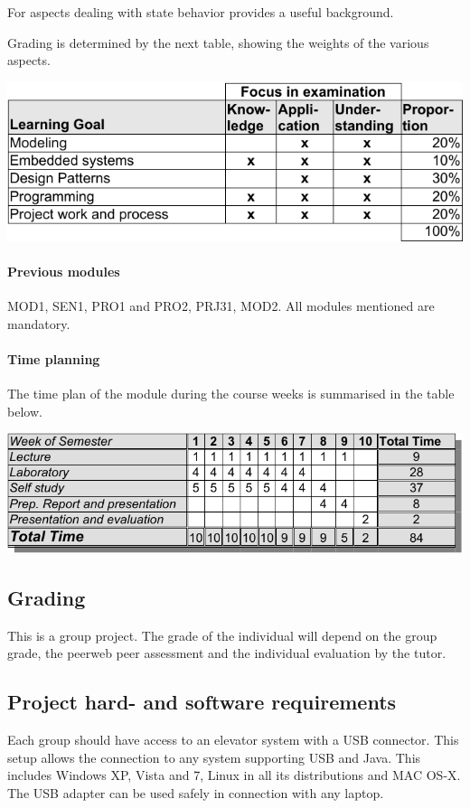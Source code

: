 For aspects dealing with state behavior \cite{DHT} provides a useful
background. 

Grading is determined by the next table, showing the weights of the various aspects.

\includegraphics{tables/learninggoals-crop.pdf}


\paragraph{Previous modules} MOD1, SEN1, PRO1 and PRO2, PRJ31, MOD2.
All modules mentioned are mandatory.

\paragraph{Time planning} The time plan of the module during the
course weeks is summarised in the table below.

\includegraphics{tables/timetable-crop.pdf}


\subsection{Grading}
This is a group project. The grade of the individual will depend on
the group grade, the peerweb peer assessment and the individual
evaluation by the tutor.

\subsection{Project hard- and software requirements}
Each group should have access to an elevator system with a USB
connector. This setup allows the connection to any system supporting
USB and Java. This includes Windows XP, Vista and 7, Linux in all its
distributions and MAC OS-X. The USB adapter can be used safely in
connection with any laptop.


